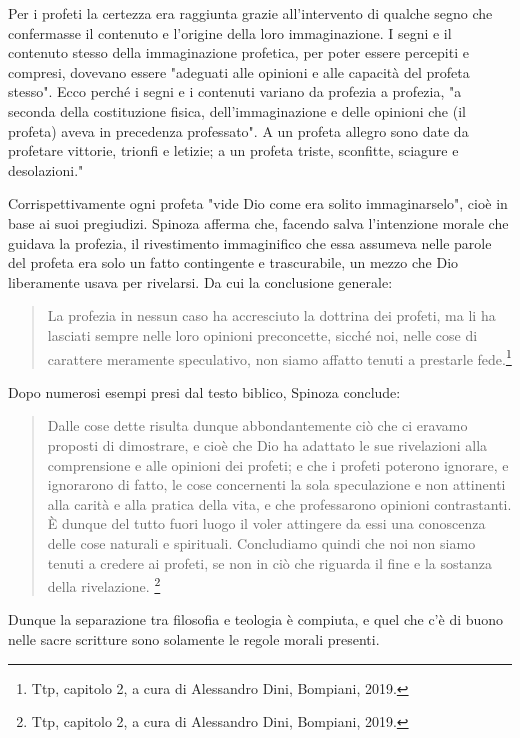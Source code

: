 Per i profeti la certezza era raggiunta
 grazie all'intervento di qualche segno che confermasse il contenuto e l'origine della loro
immaginazione. I segni e il contenuto stesso della
immaginazione profetica, per poter essere percepiti e compresi, dovevano essere "adeguati alle
opinioni e alle capacità del profeta stesso". Ecco perché i segni e i contenuti variano da profezia a
profezia, "a seconda della costituzione fisica, dell'immaginazione e delle opinioni che (il profeta)
aveva in precedenza professato". A un profeta allegro sono date da profetare vittorie, trionfi e
letizie; a un profeta triste, sconfitte, sciagure e desolazioni."

Corrispettivamente ogni profeta "vide Dio come era solito immaginarselo", cioè in base ai suoi
pregiudizi. Spinoza afferma che, facendo salva l'intenzione morale che guidava la profezia, il rivestimento immaginifico che essa assumeva nelle parole del profeta era solo un
fatto contingente e trascurabile, un mezzo che Dio liberamente usava per rivelarsi. Da cui la
conclusione generale: 

\begin{quotation}
	\small La profezia in nessun caso ha accresciuto la dottrina dei profeti, ma li ha
	lasciati sempre nelle loro opinioni preconcette, sicché noi, nelle cose di carattere meramente
	speculativo, non siamo affatto tenuti a prestarle fede.\footnote{Ttp, capitolo 2, a cura di Alessandro Dini, Bompiani, 2019.}
\end{quotation}

Dopo numerosi esempi presi dal testo biblico, Spinoza conclude:

\begin{quotation}
	\small Dalle cose dette risulta dunque abbondantemente ciò che ci eravamo proposti di
	dimostrare, e cioè che Dio ha adattato le sue rivelazioni alla comprensione e alle opinioni dei
	profeti; e che i profeti poterono ignorare, e ignorarono di fatto, le cose concernenti la sola
	speculazione e non attinenti alla carità e alla pratica della vita, e che professarono opinioni
	contrastanti. È dunque del tutto fuori luogo il voler attingere da essi una conoscenza delle cose
	naturali e spirituali. Concludiamo quindi che noi non siamo tenuti a credere ai profeti, se non in ciò
	che riguarda il fine e la sostanza della rivelazione. \footnote{Ttp, capitolo 2, a cura di Alessandro Dini, Bompiani, 2019.}
\end{quotation}

Dunque la separazione tra filosofia e teologia è compiuta, e quel che c'è di buono nelle sacre scritture sono solamente le regole morali presenti.

